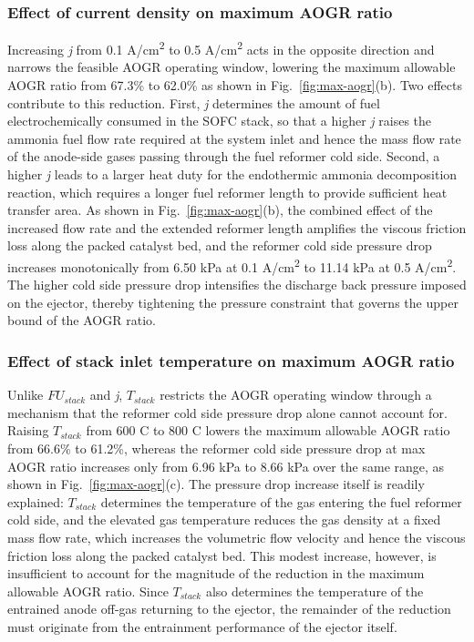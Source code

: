 \documentclass[a4paper,10pt]{cas-dc} %
\begin{document}
\subsubsection{Effect of current density on maximum AOGR ratio}
Increasing \emph{j} from 0.1 A/cm\textsuperscript{2} to 0.5 A/cm\textsuperscript{2} acts in the opposite direction and narrows the feasible AOGR operating window, lowering the maximum allowable AOGR ratio from 67.3\% to 62.0\% as shown in Fig.~\ref{fig:max-aogr}(b).
Two effects contribute to this reduction.
First, \emph{j} determines the amount of fuel electrochemically consumed in the SOFC stack, so that a higher \emph{j} raises the ammonia fuel flow rate required at the system inlet and hence the mass flow rate of the anode-side gases passing through the fuel reformer cold side.
Second, a higher \emph{j} leads to a larger heat duty for the endothermic ammonia decomposition reaction, which requires a longer fuel reformer length to provide sufficient heat transfer area.
As shown in Fig.~\ref{fig:max-aogr}(b), the combined effect of the increased flow rate and the extended reformer length amplifies the viscous friction loss along the packed catalyst bed, and the reformer cold side pressure drop increases monotonically from 6.50 kPa at 0.1 A/cm\textsuperscript{2} to 11.14 kPa at 0.5 A/cm\textsuperscript{2}.
The higher cold side pressure drop intensifies the discharge back pressure imposed on the ejector, thereby tightening the pressure constraint that governs the upper bound of the AOGR ratio.

\subsubsection{Effect of stack inlet temperature on maximum AOGR ratio}
Unlike \({FU}_{stack}\) and \emph{j}, \(T_{stack}\) restricts the AOGR operating window through a mechanism that the reformer cold side pressure drop alone cannot account for.
Raising \(T_{stack}\) from 600 \textdegree C to 800 \textdegree C lowers the maximum allowable AOGR ratio from 66.6\% to 61.2\%, whereas the reformer cold side pressure drop at max AOGR ratio increases only from 6.96 kPa to 8.66 kPa over the same range, as shown in Fig.~\ref{fig:max-aogr}(c).
The pressure drop increase itself is readily explained: \(T_{stack}\) determines the temperature of the gas entering the fuel reformer cold side, and the elevated gas temperature reduces the gas density at a fixed mass flow rate, which increases the volumetric flow velocity and hence the viscous friction loss along the packed catalyst bed.
This modest increase, however, is insufficient to account for the magnitude of the reduction in the maximum allowable AOGR ratio.
Since \(T_{stack}\) also determines the temperature of the entrained anode off-gas returning to the ejector, the remainder of the reduction must originate from the entrainment performance of the ejector itself.
\end{document}
